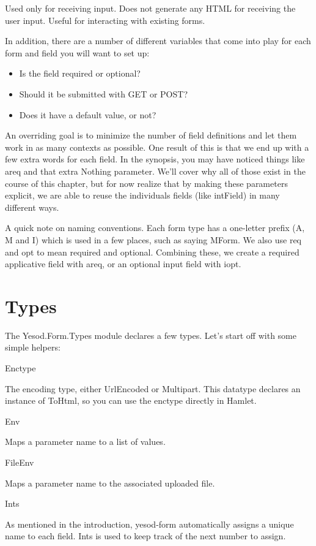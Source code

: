Used only for receiving input. Does not generate any HTML for receiving the user input. Useful for interacting with existing forms.

In addition, there are a number of different variables that come into play for each form and field you will want to set up:

\begin{itemize}
\item Is the field required or optional?
\item Should it be submitted with GET or POST?
\item Does it have a default value, or not?
\end{itemize}

An overriding goal is to minimize the number of field definitions and let them work in as many contexts as possible. One result of this is that we end up with a few extra words for each field. In the synopsis, you may have noticed things like areq and that extra Nothing parameter. We'll cover why all of those exist in the course of this chapter, but for now realize that by making these parameters explicit, we are able to reuse the individuals fields (like intField) in many different ways.

A quick note on naming conventions. Each form type has a one-letter prefix (A, M and I) which is used in a few places, such as saying MForm. We also use req and opt to mean required and optional. Combining these, we create a required applicative field with areq, or an optional input field with iopt.

\section{Types}

The Yesod.Form.Types module declares a few types. Let's start off with some simple helpers:

Enctype

The encoding type, either UrlEncoded or Multipart. This datatype declares an instance of ToHtml, so you can use the enctype directly in Hamlet.

Env

Maps a parameter name to a list of values.

FileEnv

Maps a parameter name to the associated uploaded file.

Ints

As mentioned in the introduction, yesod-form automatically assigns a unique name to each field. Ints is used to keep track of the next number to assign.

